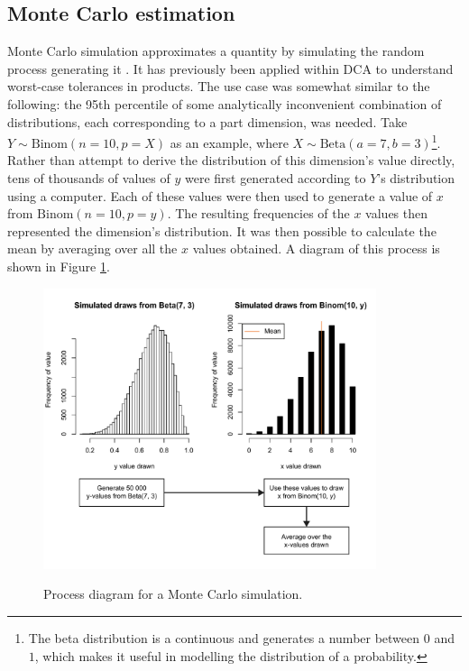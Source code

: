 \documentclass[11pt,a4paper,article]{memoir} %
\begin{document}
\subsection*{Monte Carlo estimation}
Monte Carlo simulation approximates a quantity by simulating the random process generating it . It has previously been applied within DCA to understand worst-case tolerances in products. The use case was somewhat similar to the following: the 95th percentile of some analytically inconvenient combination of distributions, each corresponding to a part dimension, was needed. Take $Y \sim \text{Binom}(n = 10, p = X)$ as an example, where $X \sim \text{Beta}(a = 7, b = 3)$\footnote{The beta distribution is a continuous and generates a number between $0$ and $1$, which makes it useful in modelling the distribution of a probability.}. Rather than attempt to derive the distribution of this dimension's value directly, tens of thousands of values of $y$ were first generated according to $Y$'s distribution using a computer. Each of these values were then used to generate a value of $x$ from $\text{Binom}(n = 10, p = y)$. The resulting frequencies of the $x$ values then represented the dimension's distribution. It was then possible to calculate the mean by averaging over all the $x$ values obtained. A diagram of this process is shown in Figure \ref{fig:monte_carlo}.
\begin{figure}[b!]
\includegraphics[width=0.87\textwidth]{monte_carlo_simulation.pdf}
\label{fig:monte_carlo}
\caption{Process diagram for a Monte Carlo simulation.}
\end{figure}


\newpage
\end{document}
